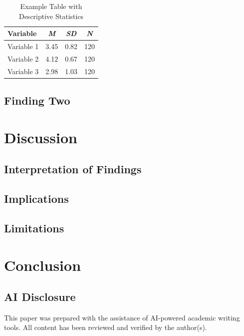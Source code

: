 \documentclass[12pt, a4paper]{article}
\begin{document}
\begin{table}[H]
\centering
\caption{Example Table with Descriptive Statistics}
\label{tab:example}
\begin{tabular}{lccc}
\toprule
\textbf{Variable} & \textbf{\textit{M}} & \textbf{\textit{SD}} & \textbf{\textit{N}} \\
\midrule
Variable 1 & 3.45 & 0.82 & 120 \\
Variable 2 & 4.12 & 0.67 & 120 \\
Variable 3 & 2.98 & 1.03 & 120 \\
\bottomrule
\end{tabular}
\end{table}

\subsection{Finding Two}

\section{Discussion}

\subsection{Interpretation of Findings}

\subsection{Implications}

\subsection{Limitations}

\section{Conclusion}

\subsection*{AI Disclosure}
This paper was prepared with the assistance of AI-powered academic writing tools. All content has been reviewed and verified by the author(s).

\newpage


\end{document}
